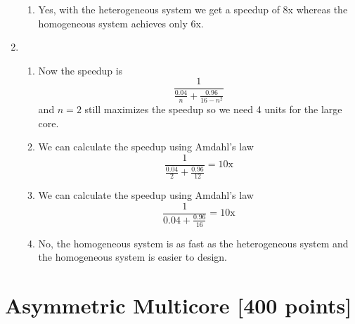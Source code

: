 \documentclass[a4paper]{article}
\begin{document}
\begin{enumerate}[label=\alph*)]
\begin{enumerate}[label=\roman*)]
            \item Yes, with the heterogeneous system we get a speedup of
                8x whereas the homogeneous system achieves only 6x.
        \end{enumerate}
    \item
        \begin{enumerate}[label=\roman*)]
            \item Now the speedup is
                \[ \frac{1}{\frac{0.04}{n} + \frac{0.96}{16-n^2}} \]
                and $n=2$ still maximizes the speedup so we need 4 units for the
                large core.

            \item We can calculate the speedup using Amdahl's law
                \[ \frac{1}{\frac{0.04}{2} + \frac{0.96}{12}} = 10\mathrm{x} \]

            \item We can calculate the speedup using Amdahl's law
                \[ \frac{1}{0.04 + \frac{0.96}{16}} = 10\mathrm{x} \]

            \item No, the homogeneous system is as fast as the heterogeneous
                system and the homogeneous system is easier to design.
        \end{enumerate}
\end{enumerate}

\section{Asymmetric Multicore [400 points]}
\end{document}
